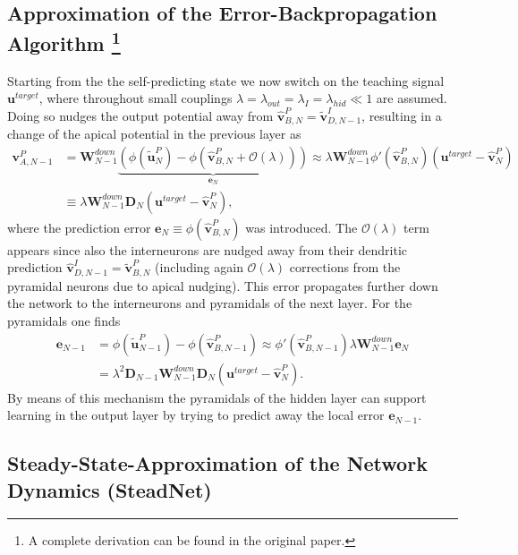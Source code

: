 \documentclass[12pt,a4paper]{article}
\begin{document}
\subsection{Approximation of the Error-Backpropagation Algorithm \protect\footnote{A complete derivation can be found in the original paper.}}
Starting from the the self-predicting state we now switch on the teaching signal $\bm{u}^{target}$, where throughout small couplings $\lambda = \lambda_{out} = \lambda_I = \lambda_{hid}\ll 1$ are assumed.\\
Doing so nudges the output potential away from $\hat{\bm{v}}^P_{B,N} = \tilde{\bm{v}}^I_{D,N-1}$, resulting in a change of the apical potential in the previous layer as
\begin{align}
\bm{v}^P_{A, N-1} &= \bm{W}^{down}_{N-1}\underbrace{\left(\phi(\tilde{\bm{u}}^P_N) - \phi(\hat{\bm{v}}^P_{B, N}  + \mathcal{O}(\lambda))\right)}_{\bm{e}_N} \approx \lambda\bm{W}^{down}_{N-1}\phi'(\hat{\bm{v}}^P_{B, N})\left(\bm{u}^{target} - \hat{\bm{v}}^P_{N}\right)\nonumber\\
&\equiv \lambda\bm{W}^{down}_{N-1}\bm{D}_N\left(\bm{u}^{target} - \hat{\bm{v}}^P_{N}\right),
\end{align}
where the prediction error $\bm{e}_N \equiv \phi(\hat{\bm{v}}^P_{B, N})$ was introduced. The $\mathcal{O}(\lambda)$ term appears since also the interneurons are nudged away from their dendritic prediction $\hat{\bm{v}}^I_{D,N-1} = \tilde{\bm{v}}^P_{B,N}$ (including again $\mathcal{O}(\lambda)$ corrections from the pyramidal neurons due to apical nudging). This error propagates further down the network to the interneurons and pyramidals of the next layer. For the pyramidals one finds
\begin{align}
\bm{e}_{N-1} &= \phi(\tilde{\bm{u}}^P_{N-1}) - \phi(\hat{\bm{v}}^P_{B,N-1}) \approx \phi'(\hat{\bm{v}}^P_{B,N-1}) \lambda \bm{W}^{down}_{N-1}\bm{e}_N\nonumber\\
&= \lambda^2 \bm{D}_{N-1}\bm{W}^{down}_{N-1}\bm{D}_N\left(\bm{u}^{target} - \hat{\bm{v}}^P_{N}\right).
\end{align}
By means of this mechanism the pyramidals of the hidden layer can support learning in the output layer by trying to predict away the local error $\bm{e}_{N-1}$.\\


\subsection{Steady-State-Approximation of the Network Dynamics (SteadNet)}
\label{chap:steadnet}
\end{document}
